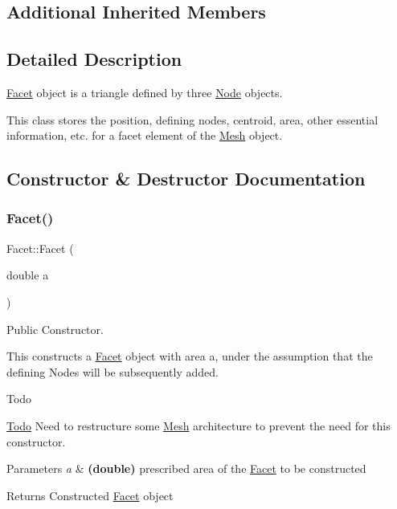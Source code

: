 \subsection*{Additional Inherited Members}


\subsection{Detailed Description}
\mbox{\hyperlink{class_facet}{Facet}} object is a triangle defined by three \mbox{\hyperlink{class_node}{Node}} objects. 

This class stores the position, defining nodes, centroid, area, other essential information, etc. for a facet element of the \mbox{\hyperlink{class_mesh}{Mesh}} object. 

\subsection{Constructor \& Destructor Documentation}
\mbox{\label{class_facet_acfcdcc63ac32fc2a1d0378a899441bbc}} 
\subsubsection{\texorpdfstring{Facet()}{Facet()}\hspace{0.1cm}{\footnotesize\ttfamily [1/2]}}
{\footnotesize\ttfamily Facet\+::\+Facet (\begin{DoxyParamCaption}\item[{double}]{a }\end{DoxyParamCaption})\hspace{0.3cm}{\ttfamily [inline]}}



Public Constructor. 

This constructs a \mbox{\hyperlink{class_facet}{Facet}} object with area a, under the assumption that the defining Nodes will be subsequently added. \begin{DoxyRefDesc}{Todo}
\item[\mbox{\hyperlink{todo__todo000008}{Todo}}]Need to restructure some \mbox{\hyperlink{class_mesh}{Mesh}} architecture to prevent the need for this constructor. \end{DoxyRefDesc}

\begin{DoxyParams}{Parameters}
{\em a} & {\bfseries (double)} prescribed area of the \mbox{\hyperlink{class_facet}{Facet}} to be constructed \\
\hline
\end{DoxyParams}
\begin{DoxyReturn}{Returns}
Constructed \mbox{\hyperlink{class_facet}{Facet}} object 
\end{DoxyReturn}
\mbox{\label{class_facet_aaecf4566bbdbfb3904d9c3ce6f7c41cf}} 
